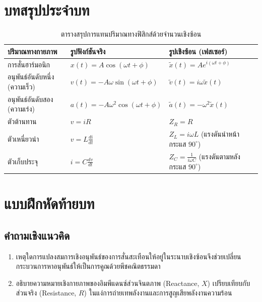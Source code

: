 \clearpage
\section{บทสรุปประจำบท}
\begin{table}[H]
    \centering
    \caption{ตารางสรุปการแทนปริมาณทางฟิสิกส์ด้วยจำนวนเชิงซ้อน}
    \label{tab:complex_summary}
    \begin{tabularx}{\textwidth}{p{3.6cm}p{4.8cm}Y}
        \toprule
        \textbf{ปริมาณทางกายภาพ} & \textbf{รูปฟังก์ชันจริง} & \textbf{รูปเชิงซ้อน (เฟสเซอร์)} \\
        \midrule
        การสั่นฮาร์มอนิก & $x(t) = A\cos(\omega t + \phi)$ & $\tilde{x}(t) = A e^{i(\omega t + \phi)}$ \\
        อนุพันธ์อันดับหนึ่ง (ความเร็ว) & $v(t) = -A\omega\sin(\omega t + \phi)$ & $\tilde{v}(t) = i\omega \tilde{x}(t)$ \\
        อนุพันธ์อันดับสอง (ความเร่ง) & $a(t) = -A\omega^2\cos(\omega t + \phi)$ & $\tilde{a}(t) = -\omega^2 \tilde{x}(t)$ \\
        ตัวต้านทาน & $v = i R$ & $Z_R = R$ \\
        ตัวเหนี่ยวนำ & $v = L \frac{di}{dt}$ & $Z_L = i\omega L$ (แรงดันนำหน้ากระแส $90^\circ$) \\
        ตัวเก็บประจุ & $i = C \frac{dv}{dt}$ & $Z_C = \frac{1}{i\omega C}$ (แรงดันตามหลังกระแส $90^\circ$) \\
        \bottomrule
    \end{tabularx}
\end{table}

\section{แบบฝึกหัดท้ายบท}
\subsection{คำถามเชิงแนวคิด}
\begin{enumerate}
    \item เหตุใดการแปลงสมการเชิงอนุพันธ์ของการสั่นสะเทือนให้อยู่ในระนาบเชิงซ้อนจึงช่วยเปลี่ยนกระบวนการหาอนุพันธ์ให้เป็นการคูณด้วยพีชคณิตธรรมดา
    \item อธิบายความหมายเชิงกายภาพของอิมพีแดนซ์ส่วนจินตภาพ (Reactance, $X$) เปรียบเทียบกับส่วนจริง (Resistance, $R$) ในแง่การถ่ายเทพลังงานและการสูญเสียพลังงานความร้อน
\end{enumerate}

